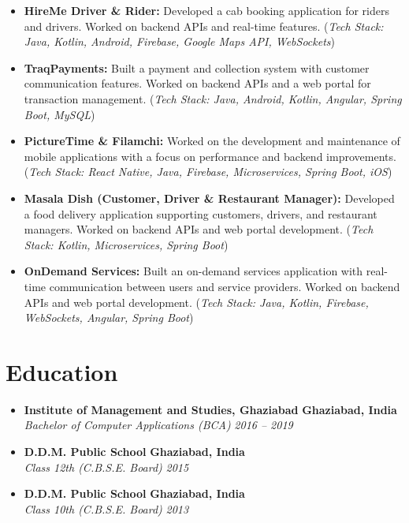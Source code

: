\documentclass[10pt, a4paper]{article}
\begin{document}
\begin{itemize}[leftmargin=1.5em, itemsep=0.75ex, topsep=0.5ex, label=\textbullet]
    \item \textbf{HireMe Driver \& Rider:} Developed a cab booking application for riders and drivers. Worked on backend APIs and real-time features. (\textit{Tech Stack: Java, Kotlin, Android, Firebase, Google Maps API, WebSockets})

    \item \textbf{TraqPayments:} Built a payment and collection system with customer communication features. Worked on backend APIs and a web portal for transaction management. (\textit{Tech Stack: Java, Android, Kotlin, Angular, Spring Boot, MySQL})

    \item \textbf{PictureTime \& Filamchi:} Worked on the development and maintenance of mobile applications with a focus on performance and backend improvements. (\textit{Tech Stack: React Native, Java, Firebase, Microservices, Spring Boot, iOS})

    \item \textbf{Masala Dish (Customer, Driver \& Restaurant Manager):} Developed a food delivery application supporting customers, drivers, and restaurant managers. Worked on backend APIs and web portal development. (\textit{Tech Stack: Kotlin, Microservices, Spring Boot})

    \item \textbf{OnDemand Services:} Built an on-demand services application with real-time communication between users and service providers. Worked on backend APIs and web portal development. (\textit{Tech Stack: Java, Kotlin, Firebase, WebSockets, Angular, Spring Boot})

\end{itemize}

\section*{Education}
\begin{itemize}[leftmargin=0pt, itemsep=1ex, topsep=0.5ex, partopsep=0pt]
    \item
    \textbf{Institute of Management and Studies, Ghaziabad} \hfill \textbf{Ghaziabad, India} \\
    \textit{Bachelor of Computer Applications (BCA)} \hfill \textit{2016 -- 2019}

    \item
    \textbf{D.D.M. Public School} \hfill \textbf{Ghaziabad, India} \\
    \textit{Class 12th (C.B.S.E. Board)} \hfill \textit{2015}

    \item
    \textbf{D.D.M. Public School} \hfill \textbf{Ghaziabad, India} \\
    \textit{Class 10th (C.B.S.E. Board)} \hfill \textit{2013}
\end{itemize}
\end{document}
